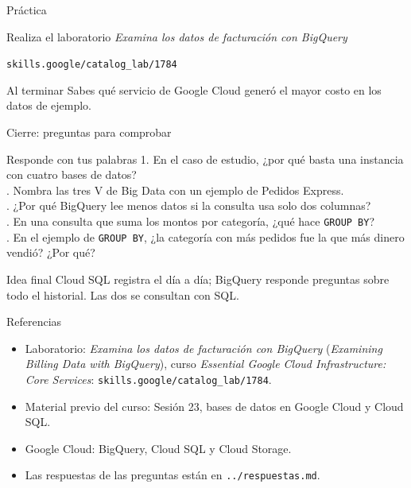 \documentclass[aspectratio=169,10pt,c]{beamer}
\begin{document}
\begin{frame}[c]{Práctica}
\begin{block}{Realiza el laboratorio}
\large \textit{Examina los datos de facturación con BigQuery}\par\vspace{1mm}
\small\texttt{skills.google/catalog\_lab/1784}
\end{block}
\begin{exampleblock}{Al terminar}
\small Sabes qué servicio de Google Cloud generó el mayor costo en los datos de ejemplo.
\end{exampleblock}
\end{frame}

\begin{frame}{Cierre: preguntas para comprobar}
\begin{block}{Responde con tus palabras}
\small
1. En el caso de estudio, ¿por qué basta una instancia con cuatro bases de datos?\\. Nombra las tres V de Big Data con un ejemplo de Pedidos Express.\\. ¿Por qué BigQuery lee menos datos si la consulta usa solo dos columnas?\\. En una consulta que suma los montos por categoría, ¿qué hace \texttt{GROUP BY}?\\. En el ejemplo de \texttt{GROUP BY}, ¿la categoría con más pedidos fue la que más dinero vendió? ¿Por qué?
\end{block}
\begin{alertblock}{Idea final}
\small Cloud SQL registra el día a día; BigQuery responde preguntas sobre todo el historial. Las dos se consultan con SQL.
\end{alertblock}
\end{frame}

\begin{frame}{Referencias}
\scriptsize
\begin{itemize}\setlength\itemsep{4pt}
  \item Laboratorio: \textit{Examina los datos de facturación con BigQuery} (\textit{Examining Billing Data with BigQuery}), curso \textit{Essential Google Cloud Infrastructure: Core Services}: \texttt{skills.google/catalog\_lab/1784}.
  \item Material previo del curso: Sesión 23, bases de datos en Google Cloud y Cloud SQL.
  \item Google Cloud: BigQuery, Cloud SQL y Cloud Storage.
  \item Las respuestas de las preguntas están en \texttt{../respuestas.md}.
\end{itemize}
\end{frame}
\end{document}
